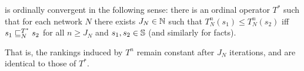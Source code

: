 


\begin{theorem}
\label{td_thm_usums_ordinal_convergence}
\usums{} is ordinally convergent in the following sense: there is an ordinal
operator $T^*$ such that for each network $N$ there exists $J_N \in \Nat$ such
that $T_N^n(s_1) \le T_N^n(s_2)$ iff $s_1 \sle_N^{T^*} s_2$ for all $n \ge J_N$
and $s_1, s_2 \in \S$ (and similarly for facts).

That is, the rankings induced by $T^n$ remain constant after $J_N$ iterations,
and are identical to those of $T^*$.
\end{theorem}

